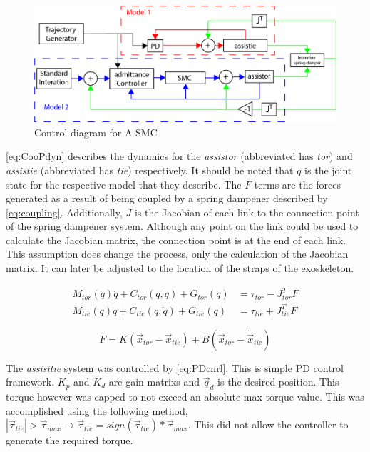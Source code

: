 \begin{figure}
    \centering
    \includegraphics[width=\linewidth]{images/controllers/SMC_control_diagram_overview.png}
    \caption[Control diagram for A-SMC]{Control diagram for A-SMC}
    \label{fig:controlDiagram}
\end{figure}

\autoref{eq:CooPdyn} describes the dynamics for the \textit{assistor} (abbreviated has \textit{tor}) and \textit{assistie} (abbreviated has \textit{tie}) respectively.  It should be noted that $q$ is the joint state for the respective model that they describe. The $F$ terms are the forces generated as a result of being coupled by a spring dampener described by \autoref{eq:coupling}. Additionally, $J$ is the Jacobian of each link to the connection point of the spring dampener system. Although any point on the link could be used to calculate the Jacobian matrix, the connection point is at the end of each link. This assumption does change the process, only the calculation of the Jacobian matrix. It can later be adjusted to the location of the straps of the exoskeleton.

\begin{equation} 
\begin{aligned}
    M_{tor}(q) \ddot{q} + C_{tor} (q,\dot{q}) + G_{tor}(q) &= \tau_{tor} - J_{tor}^T F \\
    M_{tie}(q) \ddot{q} + C_{tie} (q,\dot{q}) + G_{tie}(q) &= \tau_{tie} + J_{tie}^T F
\end{aligned}
    \label{eq:CooPdyn}
\end{equation}

\begin{equation}
    F = K ( \vec{x}_{tor} - \vec{x}_{tie} ) + B (\dot{ \vec{x}}_{tor} - \dot{ \vec{x}}_{tie} ) 
    \label{eq:coupling}
\end{equation}


The \textit{assisitie} system was controlled by \autoref{eq:PDcnrl}. This is simple PD control framework. $K_p$ and $K_d$ are gain matrixs and $\vec{q}_d$ is the desired position. This torque however was capped to not exceed an absolute max torque value. This was accomplished using the following method, $| \vec{\tau}_{tie}|> \vec{\tau}_{max} \rightarrow \vec{\tau}_{tie} = sign(\vec{\tau}_{tie})*\vec{\tau}_{max}$.  This did not allow the controller to generate the required torque. 


